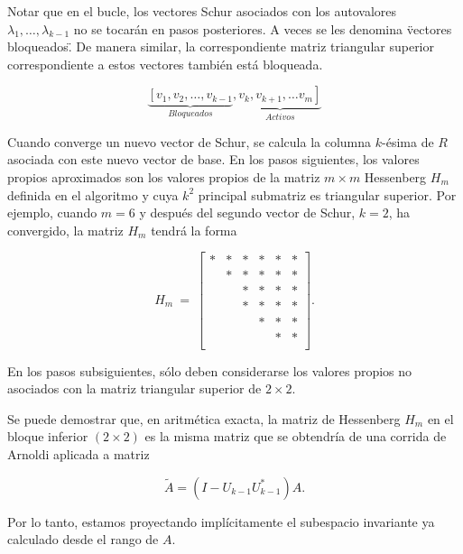 \documentclass[a4paper,openright,12pt, oneside]{book}
\begin{document}
Notar que en el bucle, los vectores Schur asociados con los autovalores $ \lambda_1, \ldots, \lambda_ {k-1} $ no se tocar\'an en pasos posteriores. A veces se les denomina \"vectores bloqueados\". De manera similar, la correspondiente matriz triangular superior correspondiente a estos vectores tambi\'en est\'a bloqueada.

\begin{displaymath}
\underbrace{\left[v_1, v_2, \ldots, v_{k-1}\right.}_{Bloqueados},
\underbrace{\left. v_k, v_{k+1}, \ldots v_m \right] }_{Activos}
\end{displaymath}

Cuando converge un nuevo vector de Schur, se calcula la columna $ k $-\'esima de $ R $ asociada con este nuevo vector de base. En los pasos siguientes, los valores propios aproximados son los valores propios de la matriz $ m \times m $ Hessenberg $ H_m $ definida en el algoritmo y cuya $ k^2 $ principal submatriz es triangular superior. Por ejemplo, cuando $ m = 6 $ y despu\'es del segundo vector de Schur, $ k = 2 $, ha convergido, la matriz $ H_m $ tendr\'a la forma

\begin{displaymath}
H_m ~ = ~
\left[ \begin{array}{cccccc}
* & * & * & * & * & * \\
 & * & * & * & * & * \\
 &  & * & * & * & * \\
 &  & * & * & * & * \\
 &  &  & * & * & * \\
 &  &  &  & * & * \\
\end{array} \right].
\end{displaymath}

En los pasos subsiguientes, s\'olo deben considerarse los valores propios no asociados con la matriz triangular superior de $ 2 \times 2 $.

Se puede demostrar que, en aritm\'etica exacta, la matriz de Hessenberg $ H_m $ en el bloque inferior $ (2 \times 2) $ es la misma matriz que se obtendr\'ia de una corrida de Arnoldi aplicada a matriz

\begin{displaymath}
\tilde A = (I-U_{k-1} U_{k-1}^{\ast} ) A.
\end{displaymath}


Por lo tanto, estamos proyectando impl\'icitamente el subespacio invariante ya calculado desde el rango de $ A $.
\end{document}
